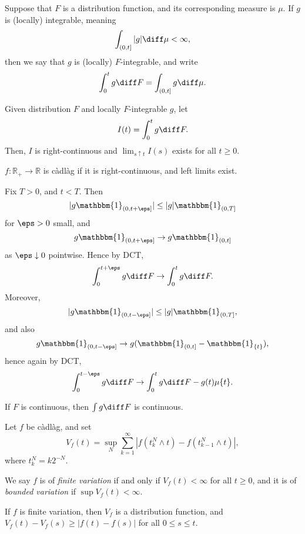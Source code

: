 \documentclass[12pt]{article}
\begin{document}
\begin{definition}
	Suppose that $F$ is a distribution function, and its corresponding measure is $\mu$. If $g$ is (locally) integrable, meaning
	\[
		\int_{(0, t]} |g| \diff \mu < \infty,
	\]
	then we say that $g$ is (locally) $F$-integrable, and write
	\[
		\int_0^t g \diff F = \int_{(0, t]} g \diff \mu.
	\]
\end{definition}


\begin{proposition}
	Given distribution $F$ and locally $F$-integrable $g$, let
	\[
	I(t) = \int_0^t g \diff F.
	\]
	Then, $I$ is right-continuous and $\lim_{s \uparrow t} I(s)$ exists for all $t \geq 0$.
\end{proposition}

\begin{definition}
	$f : \mathbb{R}_+ \to \mathbb{R}$ is c\`adl\`ag if it is right-continuous, and left limits exist.
\end{definition}

\begin{proofbox}
	Fix $T > 0$, and $t < T$. Then
	\[
		|g \mathbbm{1}_{(0, t + \eps]}| \leq |g| \mathbbm{1}_{(0, T]}
	\]
	for $\eps > 0$ small, and
	\[
		g \mathbbm{1}_{(0, t + \eps]} \to g \mathbbm{1}_{(0, t]}
	\]
	as $\eps \downarrow 0$ pointwise. Hence by DCT,
	\[
	\int_0^{t + \eps} g \diff F \to \int_0^t g \diff F.
	\]
	Moreover,
	\[
		|g \mathbbm{1}_{(0, t - \eps]}| \leq |g| \mathbbm{1}_{(0, T]},
	\]
	and also
	\[
		g \mathbbm{1}_{(0, t - \eps]} \to g (\mathbbm{1}_{(0, t]} - \mathbbm{1}_{\{t\}}),
	\]
	hence again by DCT,
	\[
		\int_0^{t - \eps} g \diff F \to \int_0^t g \diff F - g(t) \mu\{t\}.
	\]
\end{proofbox}

\begin{remark}
	If $F$ is continuous, then $\int g \diff F$ is continuous.
\end{remark}

\begin{definition}
	Let $f$ be c\`adl\`ag, and set
	\[
	V_f(t) = \sup_N \sum_{k = 1}^\infty \left| f(t_k^N \wedge t) - f(t_{k-1}^N \wedge t) \right|,
	\]
	where $t_k^N = k 2^{-N}$.

	We say $f$ is of \emph{finite variation} if and only if $V_f(t) < \infty$ for all $t \geq 0$, and it is of \emph{bounded variation} if $\sup V_f(t) < \infty$.
\end{definition}

\begin{theorem}
	If $f$ is finite variation, then $V_f$ is a distribution function, and $V_f(t) - V_f(s) \geq |f(t) - f(s)|$ for all $0 \leq s \leq t$.
\end{theorem}
\end{document}
